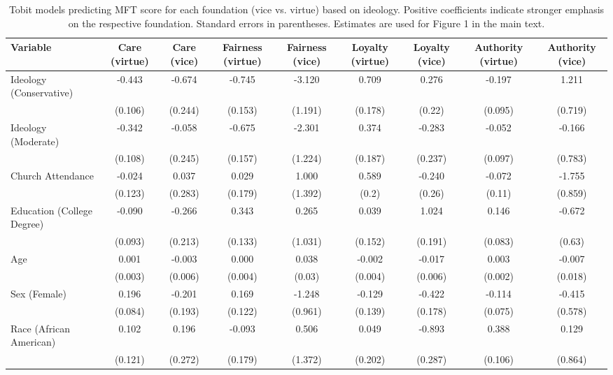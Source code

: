\begin{table}[ht]
\centering
\caption{Tobit models predicting MFT score for each foundation (vice vs. virtue) based 
           on ideology. Positive coefficients indicate stronger emphasis on the respective 
           foundation. Standard errors in parentheses. Estimates are used for Figure 
           1 in the main text.} 
\label{tab:tobit_ideol}
\begingroup\footnotesize
\begin{tabular}{lcccccccc}
  \hline
Variable & Care (virtue) & Care (vice) & Fairness (virtue) & Fairness (vice) & Loyalty (virtue) & Loyalty (vice) & Authority (virtue) & Authority (vice) \\ 
  \hline
Ideology (Conservative) & -0.443 &  -0.674 & -0.745 &  -3.120 &  0.709 &  0.276 & -0.197 &   1.211 \\ 
   & (0.106) & (0.244) & (0.153) & (1.191) & (0.178) & (0.22) & (0.095) & (0.719) \\ 
  Ideology (Moderate) & -0.342 &  -0.058 & -0.675 &  -2.301 &  0.374 & -0.283 & -0.052 &  -0.166 \\ 
   & (0.108) & (0.245) & (0.157) & (1.224) & (0.187) & (0.237) & (0.097) & (0.783) \\ 
  Church Attendance & -0.024 &   0.037 &  0.029 &   1.000 &  0.589 & -0.240 & -0.072 &  -1.755 \\ 
   & (0.123) & (0.283) & (0.179) & (1.392) & (0.2) & (0.26) & (0.11) & (0.859) \\ 
  Education (College Degree) & -0.090 &  -0.266 &  0.343 &   0.265 &  0.039 &  1.024 &  0.146 &  -0.672 \\ 
   & (0.093) & (0.213) & (0.133) & (1.031) & (0.152) & (0.191) & (0.083) & (0.63) \\ 
  Age &  0.001 &  -0.003 &  0.000 &   0.038 & -0.002 & -0.017 &  0.003 &  -0.007 \\ 
   & (0.003) & (0.006) & (0.004) & (0.03) & (0.004) & (0.006) & (0.002) & (0.018) \\ 
  Sex (Female) &  0.196 &  -0.201 &  0.169 &  -1.248 & -0.129 & -0.422 & -0.114 &  -0.415 \\ 
   & (0.084) & (0.193) & (0.122) & (0.961) & (0.139) & (0.178) & (0.075) & (0.578) \\ 
  Race (African American) &  0.102 &   0.196 & -0.093 &   0.506 &  0.049 & -0.893 &  0.388 &   0.129 \\ 
   & (0.121) & (0.272) & (0.179) & (1.372) & (0.202) & (0.287) & (0.106) & (0.864) \\ 

\end{tabular}
\end{table}
